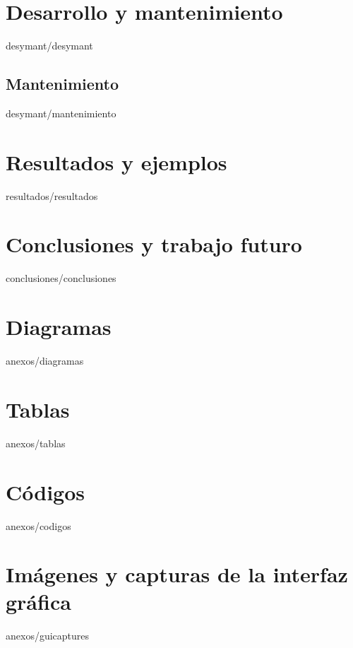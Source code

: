 \documentclass[epsbased,copyright,final,printable,covers,extendedindex,firstnumbered,tfg,gnuplot]{tfgtfmthesisuam}
\begin{document}
\chapter{Desarrollo y mantenimiento\label{CAP:DESYMANT}}{desymant/desymant}
	\section{Mantenimiento\label{SEC:MANTENIMIENTO}}{desymant/mantenimiento}
\chapter{Resultados y ejemplos\label{CAP:RESULTADOS}}{resultados/resultados}
\chapter{Conclusiones y trabajo futuro\label{CAP:CONCLUSIONES}}{conclusiones/conclusiones}


\appendix

\chapter{Diagramas\label{CAP:DIAGRAMAS}}{anexos/diagramas}
\chapter{Tablas\label{CAP:TABLAS}}{anexos/tablas}
\chapter{Códigos\label{CAP:CODIGOS}}{anexos/codigos}
\chapter{Imágenes y capturas de la interfaz gráfica\label{CAP:GUICAPTURES}}{anexos/guicaptures}
\end{document}
